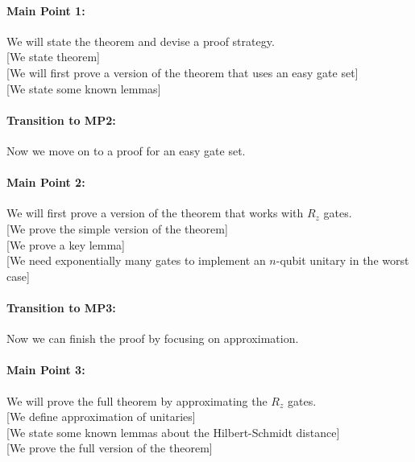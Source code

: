\documentclass[11pt]{article}
\begin{document}
\paragraph{Main Point 1:}
We will state the theorem and devise a proof strategy. \\
\hspace*{1cm}
   [We state theorem] \\ 
\hspace*{1cm}
   [We will first prove a version of the theorem that uses an easy gate set] \\
\hspace*{1cm}
   [We state some known lemmas]

\paragraph{Transition to MP2:}
Now we move on to a proof for an easy gate set.

\paragraph{Main Point 2:}
We will first prove a version of the theorem that works with $R_z$ gates. \\
\hspace*{1cm}
   [We prove the simple version of the theorem] \\
\hspace*{1cm}
   [We prove a key lemma] \\
\hspace*{1cm}
   [We need exponentially many gates to implement an $n$-qubit unitary in the worst case] 

\paragraph{Transition to MP3:}
Now we can finish the proof by focusing on approximation.

\paragraph{Main Point 3:}
We will prove the full theorem by approximating the $R_z$ gates. \\
\hspace*{1cm}
   [We define approximation of unitaries] \\
\hspace*{1cm}
   [We state some known lemmas about the Hilbert-Schmidt distance] \\
\hspace*{1cm}
   [We prove the full version of the theorem] 
\end{document}
